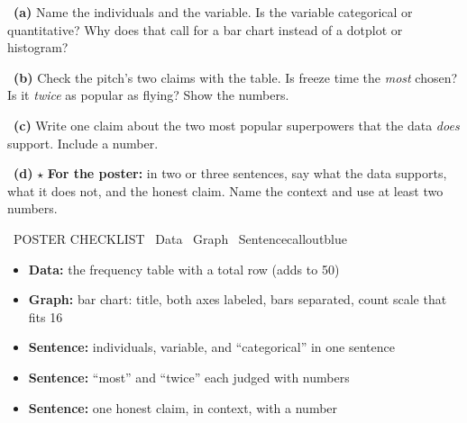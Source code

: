 ~\textbf{(a)} Name the individuals and the variable. Is the variable categorical or quantitative? Why does that call for a bar chart instead of a dotplot or histogram?
\workspace{0.8in}

~\textbf{(b)} Check the pitch's two claims with the table. Is freeze time the \emph{most} chosen? Is it \emph{twice} as popular as flying? Show the numbers.
\workspace{0.95in}

~\textbf{(c)} Write one claim about the two most popular superpowers that the data \emph{does} support. Include a number.
\workspace{0.8in}

~\textbf{(d)} $\star$ \textbf{For the poster:} in two or three sentences, say what the data supports, what it does not, and the honest claim. Name the context and use at least two numbers.
\workspace{1.45in}

\newpage
\begin{callout}{\IconTarget\ POSTER CHECKLIST \textperiodcentered\ Data \textperiodcentered\ Graph \textperiodcentered\ Sentence}{calloutblue}
\begin{itemize}[leftmargin=1.6em,itemsep=1pt,topsep=1pt]
  \item[$\square$] \textbf{Data:} the frequency table with a total row (adds to 50)
  \item[$\square$] \textbf{Graph:} bar chart: title, both axes labeled, bars separated, count scale that fits 16
  \item[$\square$] \textbf{Sentence:} individuals, variable, and ``categorical'' in one sentence
  \item[$\square$] \textbf{Sentence:} ``most'' and ``twice'' each judged with numbers
  \item[$\square$] \textbf{Sentence:} one honest claim, in context, with a number
\end{itemize}
\posterrule
\end{callout}


